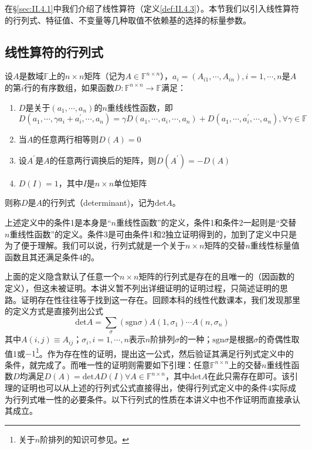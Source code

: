 \documentclass[main.tex]{subfiles}
\begin{document}
在\S\ref{sec:II.4.1}中我们介绍了线性算符（定义\ref{def:II.4.3}）。本节我们以引入线性算符的行列式、特征值、不变量等几种取值不依赖基的选择的标量参数。

\subsection{线性算符的行列式}
\begin{definition}[行列式]
设$A$是数域$\mathbb{F}$上的$n\times n$矩阵（记为$A\in\mathbb{F}^{n\times n}$），$a_i=\left(A_{i1},\cdots,A_{in}\right),i=1,\cdots,n$是$A$的第$i$行的有序数组，如果函数$D:\mathbb{F}^{n\times n}\rightarrow\mathbb{F}$满足：
\begin{enumerate}
\item $D$是关于$\left(a_1,\cdots,a_n\right)$的$n$重线线性函数，即
\[
D\left(a_1,\cdots,\gamma a_i+a^\prime_i,\cdots,a_n\right)=\gamma D\left(a_1,\cdots,a_i,\cdots,a_n\right)+D\left(a_1,\cdots,a^\prime_i,\cdots,a_n\right),\forall\gamma\in\mathbb{F}
\]
\item 当$A$的任意两行相等则$D\left(A\right)=0$
\item 设$A^\prime$是$A$的任意两行调换后的矩阵，则$D\left(A^\prime\right)=-D\left(A\right)$
\item $D\left(I\right)=1$，其中$I$是$n\times n$单位矩阵
\end{enumerate}
则称$D$是$A$的行列式（determinant)，记为$\mathrm{det}A$。
\end{definition}
上述定义中的条件1是本身是“$n$重线性函数”的定义，条件1和条件2一起则是“交替$n$重线性函数”的定义。条件3是可由条件1和2独立证明得到的，加到了定义中只是为了便于理解。我们可以说，行列式就是一个关于$n\times n$矩阵的交替$n$重线性标量值函数且其还满足条件4的。

上面的定义隐含默认了任意一个$n\times n$矩阵的行列式是存在的且唯一的（因函数的定义），但这未被证明。本讲义暂不列出详细证明的证明过程，只简述证明的思路。证明存在性往往等于找到这一存在。回顾本科的线性代数课本，我们发现那里的定义方式\cite[\S 1.3“定义3.1”,p.~7]{周胜林2012线性代数}是直接列出公式
\[
\mathrm{det}A=\sum_{\sigma}\left(\mathrm{sgn}\sigma\right)A\left(1,\sigma_1\right)\cdots A\left(n,\sigma_n\right)
\]
其中$A\left(i,j\right)\equiv A_{ij}$；$\sigma_i,i=1,\cdots,n$表示$n$阶排列$\sigma$的一种；$\mathrm{sgn}\sigma$是根据$\sigma$的奇偶性取值1或$-1$\footnote{关于$n$阶排列的知识可参见\cite[\S1.2,p.~4]{周胜林2012线性代数}。}。作为存在性的证明，提出这一公式，然后验证其满足行列式定义中的条件，就完成了。而唯一性的证明则需要如下引理：任意$\mathbb{F}^{n\times n}$上的交替$n$重线性函数$D$均满足$D\left(A\right)=\mathrm{det}AD\left(I\right)\forall A\in\mathbb{F}^{n\times n}$，其中$\mathrm{det}A$在此只需存在即可。该引理的证明也可以从上述的行列式公式直接得出，使得行列式定义中的条件4实际成为行列式唯一性的必要条件。以下行列式的性质在本讲义中也不作证明而直接承认其成立。
\end{document}
